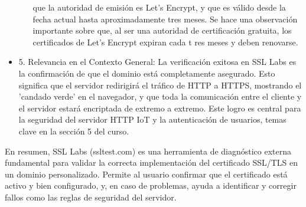 \documentclass{report}
\begin{document}
\begin{itemize}
\begin{itemize}
            que la autoridad de emisión es Let's Encrypt, y que es válido desde la fecha actual hasta aproximadamente tres meses. Se hace una 
            observación importante sobre que, al ser una autoridad de certificación gratuita, los certificados de Let's Encrypt expiran cada t
            res meses y deben renovarse.
        \end{itemize}
    \item 5. Relevancia en el Contexto General: La verificación exitosa en SSL Labs es la confirmación de que el dominio está completamente 
    asegurado. Esto significa que el servidor redirigirá el tráfico de HTTP a HTTPS, mostrando el 'candado verde' en el navegador, y que 
    toda la comunicación entre el cliente y el servidor estará encriptada de extremo a extremo. Este logro es central para la seguridad del 
    servidor HTTP IoT y la autenticación de usuarios, temas clave en la sección 5 del curso.
\end{itemize}
En resumen, SSL Labs (ssltest.com) es una herramienta de diagnóstico externa fundamental para validar la correcta implementación 
del certificado SSL/TLS en un dominio personalizado. Permite al usuario confirmar que el certificado está activo y bien configurado, 
y, en caso de problemas, ayuda a identificar y corregir fallos como las reglas de seguridad del servidor.
\end{document}
